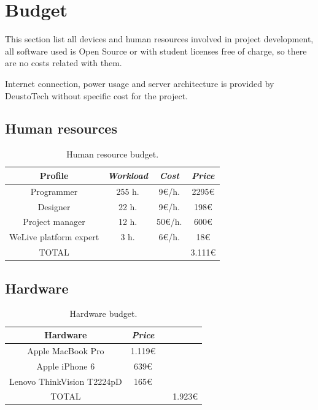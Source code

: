 \documentclass{DeustoFDP}
\begin{document}
\chapter{Budget}\label{cha:budget}
This section list all devices and human resources involved in project development, all software used is Open Source or with student licenses free of charge, so there are no costs related with them.

Internet connection, power usage and server architecture is provided by DeustoTech without specific cost for the project.

\section{Human resources}
\begin{table}[H]
	\centering
	\caption{Human resource budget.}\label{tab:budgetprofile}
	\begin{tabular}{cccc}
		\toprule
		\textbf{Profile} & \emph{Workload} & \emph{Cost} & \emph{Price}\\
		\midrule
		Programmer  & 255 h.     & 9€/h. & 2295€ \\
		Designer   & 22 h.     & 9€/h. & 198€ \\
		Project manager & 12 h.     & 50€/h.  & 600€ \\
		WeLive platform expert & 3 h.     & 6€/h. & 18€ \\
		TOTAL & & & 3.111€\\
		\bottomrule
	\end{tabular}
\end{table}

\section{Hardware}
\begin{table}[H]
	\centering
	\caption{Hardware budget.}\label{tab:budgethardware}
	\begin{tabular}{cccc}
		\toprule
		\textbf{Hardware} & \emph{Price}\\
		\midrule
		Apple MacBook Pro  & 1.119€ \\
		Apple iPhone 6 & 639€ \\
		Lenovo ThinkVision T2224pD & 165€ \\
		
		TOTAL & & & 1.923€\\
		\bottomrule
	\end{tabular}
\end{table}
\end{document}
